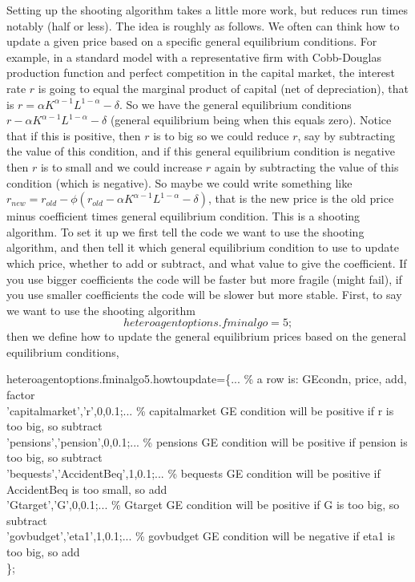 Setting up the shooting algorithm takes a little more work, but reduces run times notably (half or less). The idea is roughly as follows. We often can think how to update a given price based on a specific general equilibrium conditions. For example, in a standard model with a representative firm with Cobb-Douglas production function and perfect competition in the capital market, the interest rate $r$ is going to equal the marginal product of capital (net of depreciation), that is $r=\alpha K^{\alpha-1} L^{1-\alpha}-\delta$. So we have the general equilibrium conditions $r-\alpha K^{\alpha-1} L^{1-\alpha}-\delta$ (general equilibrium being when this equals zero). Notice that if this is positive, then $r$ is to big so we could reduce $r$, say by subtracting the value of this condition, and if this general equilibrium condition is negative then $r$ is to small and we could increase $r$ again by subtracting the value of this condition (which is negative). So maybe we could write something like $r_{new}=r_{old}-\phi (r_{old}-\alpha K^{\alpha-1} L^{1-\alpha}-\delta)$, that is the new price is the old price minus coefficient times general equilibrium condition. This is a shooting algorithm. To set it up we first tell the code we want to use the shooting algorithm, and then tell it which general equilibrium condition to use to update which price, whether to add or subtract, and what value to give the coefficient. If you use bigger coefficients the code will be faster but more fragile (might fail), if you use smaller coefficients the code will be slower but more stable. First, to say we want to use the shooting algorithm
\begin{equation*}
 heteroagentoptions.fminalgo=5;
\end{equation*}
then we define how to update the general equilibrium prices based on the general equilibrium conditions,
\begin{table}[h!]
\footnotesize
heteroagentoptions.fminalgo5.howtoupdate=\{...  \% a row is: GEcondn, price, add, factor \\
\phantom{aaa} 'capitalmarket','r',0,0.1;...  \% capitalmarket GE condition will be positive if r is too big, so subtract \\
\phantom{aaa} 'pensions','pension',0,0.1;... \% pensions GE condition will be positive if pension is too big, so subtract \\
\phantom{aaa} 'bequests','AccidentBeq',1,0.1;... \% bequests GE condition will be positive if AccidentBeq is too small, so add \\
\phantom{aaa} 'Gtarget','G',0,0.1;... \% Gtarget GE condition will be positive if G is too big, so subtract \\
\phantom{aaa} 'govbudget','eta1',1,0.1;... \% govbudget GE condition will be negative if eta1 is too big, so add \\
    \};
\end{table}
